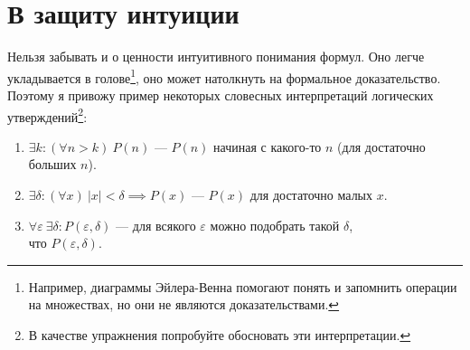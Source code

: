 \part{В защиту интуиции}

Нельзя забывать и о ценности интуитивного понимания формул.
Оно легче укладывается в голове\footnote{Например, диаграммы
	Эйлера-Венна помогают понять и запомнить операции на множествах, но они
	не являются доказательствами.},
оно может натолкнуть на формальное доказательство. Поэтому я привожу пример
некоторых словесных интерпретаций логических утверждений\footnote{В качестве
	упражнения попробуйте обосновать эти интерпретации.}:
\begin{enumerate}
	\item{}$\exists k:(\forall n>k)~P(n)$ --- $P(n)$ начиная с какого-то $n$
	(для достаточно больших $n$).
	\item{}$\exists \delta:(\forall x)~|x|<\delta\implies P(x)$ --- $P(x)$ для
	достаточно малых $x$.
	\item{}$\forall \varepsilon~\exists \delta:P(\varepsilon,\delta)$ ---
	для всякого $\varepsilon$ можно подобрать такой $\delta$,\\что $P(\varepsilon,\delta)$.
\end{enumerate}

